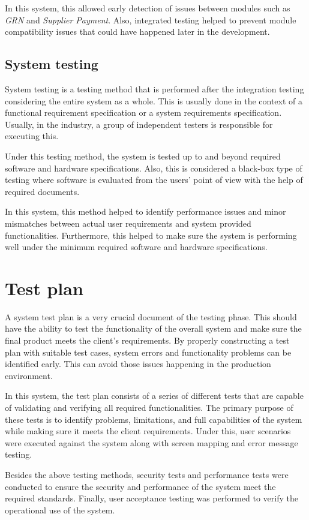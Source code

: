 \documentclass[12pt]{report}
\begin{document}
In this system, this allowed early detection of issues between modules such as {\it{GRN}} and {\it{Supplier Payment}}. Also, integrated testing helped to prevent module compatibility issues that could have happened later in the development.

\subsection{System testing}
System testing is a testing method that is performed after the integration testing considering the entire system as a whole. This is usually done in the context of a functional requirement specification or a system requirements specification. Usually, in the industry, a group of independent testers is responsible for executing this.

Under this testing method, the system is tested up to and beyond required software and hardware specifications. Also, this is considered a black-box type of testing where software is evaluated from the users' point of view with the help of required documents.

In this system, this method helped to identify performance issues and minor mismatches between actual user requirements and system provided functionalities. Furthermore, this helped to make sure the system is performing well under the minimum required software and hardware specifications.

\section{Test plan}
A system test plan is a very crucial document of the testing phase. This should have the ability to test the functionality of the overall system and make sure the final product meets the client's requirements. By properly constructing a test plan with suitable test cases, system errors and functionality problems can be identified early. This can avoid those issues happening in the production environment.

In this system, the test plan consists of a series of different tests that are capable of validating and verifying all required functionalities. The primary purpose of these tests is to identify problems, limitations, and full capabilities of the system while making sure it meets the client requirements. Under this, user scenarios were executed against the system along with screen mapping and error message testing.

Besides the above testing methods, security tests and performance tests were conducted to ensure the security and performance of the system meet the required standards. Finally, user acceptance testing was performed to verify the operational use of the system.
\end{document}
